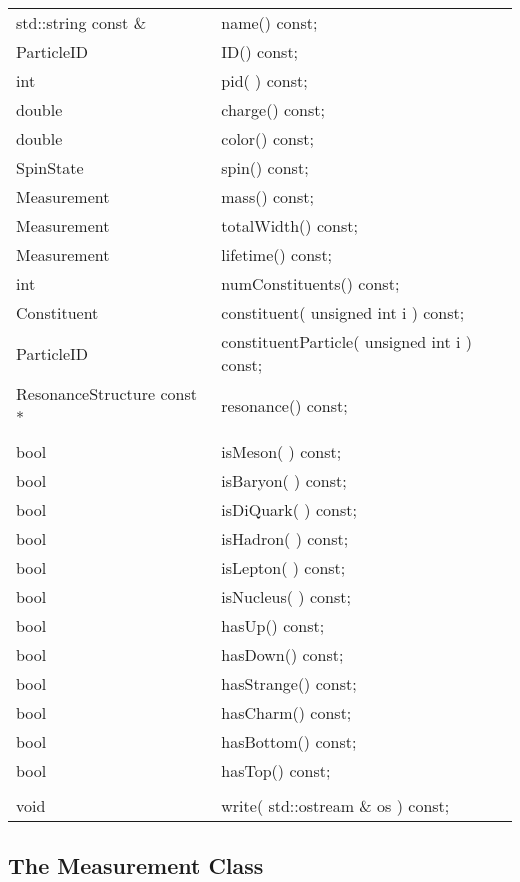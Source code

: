 \begin{center}
\begin{tabular}{ll}
  std::string const \&         & name()        const;  \\    
  ParticleID                  & ID()          const; \\
  int                         & pid( )        const; \\
  double                      & charge()      const; \\
  double                      & color()       const; \\
  SpinState                   & spin()        const; \\
  Measurement                 & mass()        const; \\
  Measurement                 & totalWidth()  const; \\
  Measurement                 & lifetime()    const; \\
  int                         & numConstituents() const; \\
   Constituent          & constituent( unsigned int i ) const; \\
   ParticleID           & constituentParticle( unsigned int i ) const; \\
  ResonanceStructure const *  & resonance()   const; \\
 \\
  bool & isMeson( )   const; \\
  bool & isBaryon( )  const; \\
  bool & isDiQuark( ) const; \\
  bool & isHadron( )  const; \\
  bool & isLepton( )  const; \\
  bool & isNucleus( ) const; \\
  bool & hasUp()      const; \\
  bool & hasDown()    const; \\
  bool & hasStrange() const; \\
  bool & hasCharm()   const; \\
  bool & hasBottom()  const; \\
  bool & hasTop()     const; \\
   \\
   void & write( std::ostream \& os ) const; \\
\end{tabular}
\end{center}

\subsection{ The Measurement Class }

